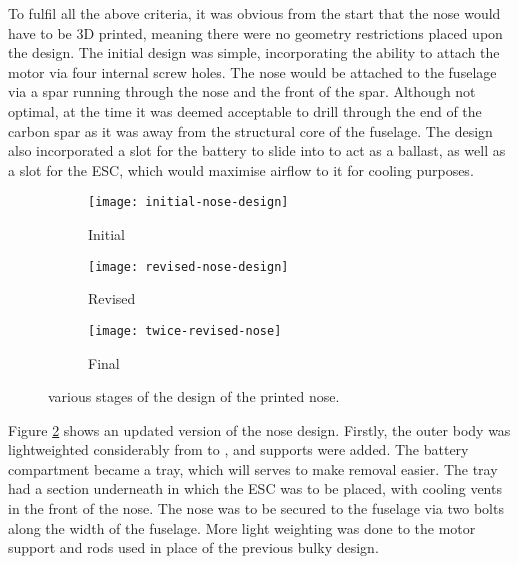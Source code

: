 \documentclass[../../main.tex]{subfiles}
\begin{document}
To fulfil all the above criteria, it was obvious from the start that the nose would have to be 3D printed, meaning there were no geometry restrictions placed upon the design. 
The initial design was simple, incorporating the ability to attach the motor via four internal screw holes.
The nose would be attached to the fuselage via a spar running through the nose and the front of the spar.
Although not optimal, at the time it was deemed acceptable to drill through the end of the carbon spar as it was away from the structural core of the fuselage.
The design also incorporated a slot for the battery to slide into to act as a ballast, as well as a slot for the ESC, which would maximise airflow to it for cooling purposes.

\begin{figure}[H]
    \centering
    \begin{subfigure}[b]{0.6\columnwidth}
        \centering
        \texttt{[image: initial-nose-design]}
        \caption{Initial}
        \label{fig:nose-design-progression:initial}
    \end{subfigure}
    
    \begin{subfigure}[b]{0.6\columnwidth}
        \centering
        \texttt{[image: revised-nose-design]}
        \caption{Revised}
        \label{fig:nose-design-progression:revised}
    \end{subfigure}

    \begin{subfigure}[b]{0.6\columnwidth}
        \centering
        \texttt{[image: twice-revised-nose]}
        \caption{Final}
        \label{fig:nose-design-progression:final}
    \end{subfigure}
    
    \caption{various stages of the design of the printed nose.}
    \label{fig:nose-design-progression}
\end{figure} 


Figure \ref{fig:nose-design-progression:revised} shows an updated version of the nose design.
Firstly, the outer body was lightweighted considerably from  to , and supports were added.
The battery compartment became a tray, which will serves to make removal easier.
The tray had a section underneath in which the ESC was to be placed, with cooling vents in the front of the nose.
The nose was to be secured to the fuselage via two bolts along the width of the fuselage.
More light weighting was done to the motor support and rods used in place of the previous bulky design. 
\end{document}
